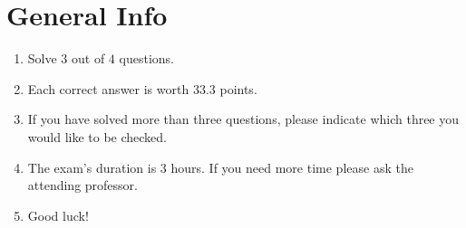 \documentclass{article}
\begin{document}

\section*{General Info}
\begin{enumerate}
\item Solve $3$ out of $4$ questions.
\item Each correct answer is worth $33.3$ points.
\item If you have solved more than three questions, please indicate which three you would like to be checked.
\item The exam's duration is 3 hours. If you need more time please ask the attending professor.
\item Good luck!
\end{enumerate}
\end{document}
